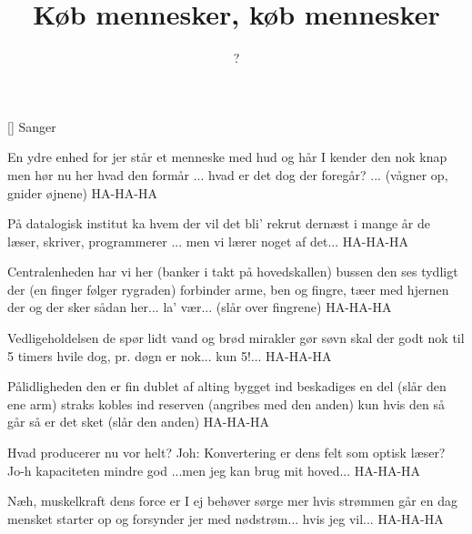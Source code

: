 \documentclass[a4paper,11pt]{article}
\title{Køb mennesker, køb mennesker}
\author{?}
\begin{document}
\maketitle

\begin{roles}
[] Sanger
\end{roles}

\begin{song}
En ydre enhed for jer står
et menneske med hud og hår
I kender den nok knap
men hør nu her hvad den formår
... hvad er det dog der foregår? ... (vågner op, gnider øjnene)
HA-HA-HA

På datalogisk institut
ka hvem der vil det bli' rekrut
dernæst i mange år
de læser, skriver, programmerer
... men vi lærer noget af det...
HA-HA-HA

Centralenheden har vi her (banker i takt på hovedskallen)
bussen den ses tydligt der (en finger følger rygraden)
forbinder arme, ben
og fingre, tæer med hjernen der
og der sker sådan her... la' vær... (slår over fingrene)
HA-HA-HA

Vedligeholdelsen de spør
lidt vand og brød mirakler gør
søvn skal der godt nok til
5 timers hvile dog, pr. døgn
er nok... kun 5!...
HA-HA-HA

Pålidligheden den er fin
dublet af alting bygget ind
beskadiges en del (slår den ene arm)
straks kobles ind reserven (angribes med den anden)
kun hvis den så går så er det sket (slår den anden)
HA-HA-HA

Hvad producerer nu vor helt?
Joh: Konvertering er dens felt
som optisk læser? Jo-h
kapaciteten mindre god
...men jeg kan brug mit hoved...
HA-HA-HA

Næh, muskelkraft dens force er
I ej behøver sørge mer
hvis strømmen går en dag
mensket starter op og forsynder
jer med nødstrøm... hvis jeg vil...
HA-HA-HA
\end{song}
\end{document}
